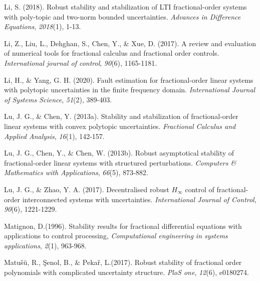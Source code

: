 \documentclass[]{interact}
\theoremstyle{plain}%
\theoremstyle{definition}
\theoremstyle{remark}
\begin{document}
\begin{thebibliography}{}
	Li, S. (2018). Robust stability and stabilization of LTI fractional-order systems with poly-topic and two-norm bounded uncertainties. \emph{Advances in Difference Equations}, \emph{2018}(1), 1-13.
	
	Li, Z., Liu, L., Dehghan, S., Chen, Y., \& Xue, D. (2017). A review and evaluation of numerical tools for fractional calculus and fractional order controls. \emph{International journal of control}, \emph{90}(6), 1165-1181.
	
	Li, H., \& Yang, G. H. (2020). Fault estimation for fractional-order linear systems with polytopic uncertainties in the finite frequency domain. \emph{International Journal of Systems Science}, \emph{51}(2), 389-403.

	
	Lu, J. G., \& Chen, Y. (2013a). Stability and stabilization of fractional-order linear systems with convex polytopic uncertainties. \emph{Fractional Calculus and Applied Analysis}, \emph{16}(1), 142-157.
	
	Lu, J. G., Chen, Y., \& Chen, W. (2013b). Robust asymptotical stability of fractional-order linear systems with structured perturbations. \emph{Computers \& Mathematics with Applications}, \emph{66}(5), 873-882.
	
	Lu, J. G., \& Zhao, Y. A. (2017). Decentralised robust $H_\infty$ control of fractional-order interconnected systems with uncertainties. \emph{International Journal of Control}, \emph{90}(6), 1221-1229. 
	
	Matignon, D.(1996). Stability results for fractional differential equations with applications to control processing, \emph{Computational engineering in systems applications}, \emph{2}(1), 963-968.
	
     Matu{\v{s}}{\u{u}}, R., \c{S}enol, B., \& Peka\v{r}, L.(2017). Robust stability of fractional order polynomials with complicated uncertainty structure. \emph{PloS one}, \emph{12}(6), e0180274.
	 

\end{thebibliography}
\end{document}
